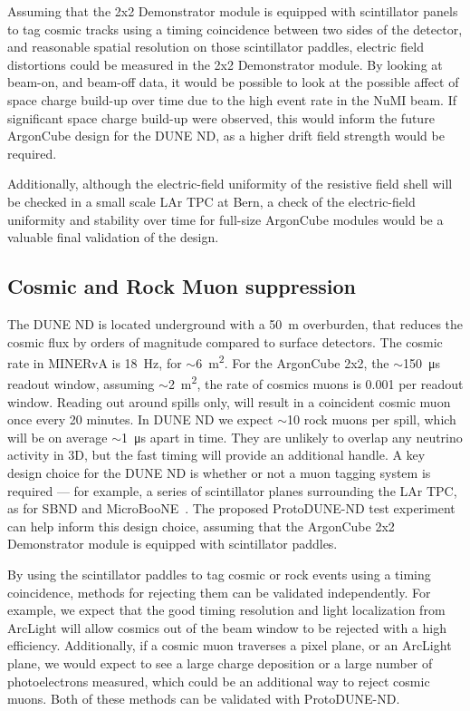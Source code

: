 Assuming that the 2x2 Demonstrator module is equipped with scintillator panels to tag cosmic tracks using a timing coincidence between two sides of the detector, and reasonable spatial resolution on those scintillator paddles, electric field distortions could be measured in the 2x2 Demonstrator module. By looking at beam-on, and beam-off data, it would be possible to look at the possible affect of space charge build-up over time due to the high event rate in the NuMI beam. If significant space charge build-up were observed, this would inform the future ArgonCube design for the DUNE ND, as a higher drift field strength would be required.

Additionally, although the electric-field uniformity of the resistive field shell will be checked in a small scale LAr TPC at Bern, a check of the electric-field uniformity and stability over time for full-size ArgonCube modules would be a valuable final validation of the design.

\subsection{Cosmic and Rock Muon suppression}
\label{sec:cosmic-suppression}

The DUNE ND is located underground with a \SI{50}{\metre} overburden, that reduces the cosmic flux by orders of magnitude compared to surface detectors. The cosmic rate in MINERvA is \SI{18}{\hertz}, for $\sim$\SI{6}{\metre\squared}.  For the ArgonCube 2x2, the $\sim$\SI{150}{\micro\second} readout window, assuming $\sim$\SI{2}{\metre\squared}, the rate of cosmics muons is 0.001 per readout window. Reading out around spills only, will result in a coincident cosmic muon once every 20 minutes.
In DUNE ND we expect $\sim$10 rock muons per spill, which will be on average $\sim$\SI{1}{\micro\second} apart in time. They are unlikely to overlap any neutrino activity in 3D, but the fast timing will provide an additional handle.
A key design choice for the DUNE ND is whether or not a muon tagging system is required --- for example, a series of scintillator planes surrounding the LAr TPC, as for SBND and MicroBooNE~\cite{CRT}. The proposed ProtoDUNE-ND test experiment can help inform this design choice, assuming that the ArgonCube 2x2 Demonstrator module is equipped with scintillator paddles.

By using the scintillator paddles to tag cosmic or rock events using a timing coincidence, methods for rejecting them can be validated independently. For example, we expect that the good timing resolution and light localization from ArcLight will allow cosmics out of the beam window to be rejected with a high efficiency. Additionally, if a cosmic muon traverses a pixel plane, or an ArcLight plane, we would expect to see a large charge deposition or a large number of photoelectrons measured, which could be an additional way to reject cosmic muons. Both of these methods can be validated with ProtoDUNE-ND.

